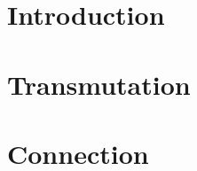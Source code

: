 \documentclass[paper=6in:9in,pagesize=pdftex,
 headinclude=off,footinclude=on,11pt,twoside]{scrbook}
\begin{document}

\setcounter{tocdepth}{1}
\tableofcontents
\chapter{Introduction}

\clearpage
\chapter{Transmutation}

\clearpage
\chapter{Connection}

\begin{comment}
\chapter{Sameness}


\clearpage
\chapter{Resource composition}


\clearpage
\chapter{Motion}


\clearpage
\chapter{Creating categories}


\clearpage

\chapter{Thinking about alternatives}

\clearpage

\chapter{Concepts of  Formal Engineering Design}

\clearpage


\end{comment}
\end{document}
